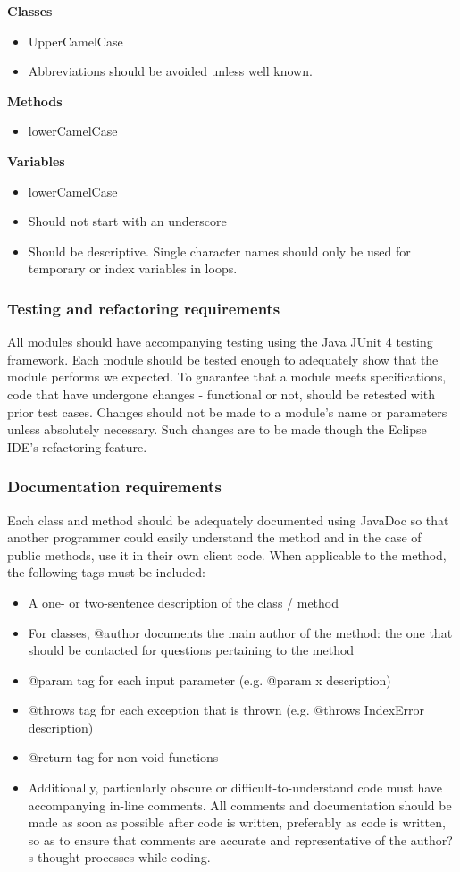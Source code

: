 \documentclass{article}
\begin{document}
\noindent\textbf{Classes}
\begin{itemize}
\item UpperCamelCase
\item Abbreviations should be avoided unless well known.
\end{itemize}

\noindent\textbf{Methods}
\begin{itemize}
\item lowerCamelCase
\end{itemize}
 
\noindent\textbf{Variables}
\begin{itemize}
\item lowerCamelCase
\item Should not start with an underscore
\item Should be descriptive. Single character names should only be used for temporary or index variables in loops.
\end{itemize}

\subsubsection{Testing and refactoring requirements}
All modules should have accompanying testing using the Java JUnit 4 testing framework. Each module should be tested enough to adequately show that the module performs we expected. To guarantee that a module meets specifications, code that have undergone changes - functional or not, should be retested with prior test cases. Changes should not be made to a module's name or parameters unless absolutely necessary. Such changes are to be made though the Eclipse IDE's refactoring feature.

\subsubsection{Documentation requirements}
Each class and method should be adequately documented using JavaDoc so that another programmer could easily understand the method and in the case of public methods, use it in their own client code. When applicable to the method, the following tags must be included:
\begin{itemize}
\item A one- or two-sentence description of the class / method
\item For classes, @author documents the main author of the method: the one that should be contacted for questions pertaining to the method
\item @param tag for each input parameter (e.g. @param x description)
\item @throws tag for each exception that is thrown (e.g. @throws IndexError description)
\item @return tag for non-void functions
\item Additionally, particularly obscure or difficult-to-understand code must have accompanying in-line comments. All comments and documentation should be made as soon as possible after code is written, preferably as code is written, so as to ensure that comments are accurate and representative of the author?s thought processes while coding.
\end{itemize}
\end{document}
